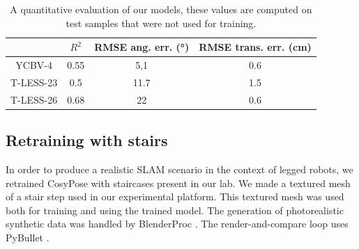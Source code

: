 \begin{table}[h]
    \centering
    \begin{tabular}{|c|c|c|c|}
        \hline 
          & $\displaystyle R^{2}$ & RMSE ang. err. (°) & RMSE trans. err. (cm) \\
        \hline 
         YCBV-4 & 0.55 & 5,1 & 0.6 \\
        \hline 
         T-LESS-23 & 0.5 & 11.7 & 1.5 \\
        \hline 
         T-LESS-26 & 0.68 & 22 & 0.6 \\
         \hline
    \end{tabular}
    \caption{A quantitative evaluation of our models, these values are computed on test samples that were not used for training. }
    \label{table:empirical_models}
\end{table}



\subsection{Retraining with stairs}
\label{sec:retraining_with_stairs}
In order to produce a realistic SLAM scenario in the context of legged robots, we retrained CosyPose with staircases present in our lab.
We made a textured mesh of a stair step used in our experimental platform. This textured mesh was used both for training and using the trained model. 
The generation of photorealistic synthetic data was handled by BlenderProc \cite{denninger2019blenderproc}. The render-and-compare loop uses PyBullet \cite{coumans2021}.

